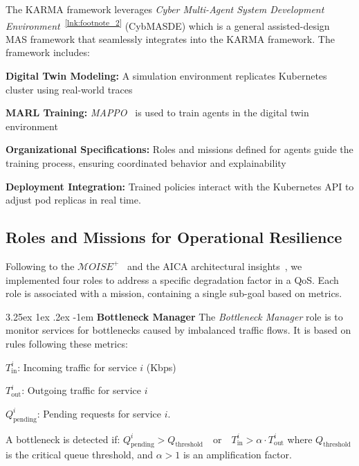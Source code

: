 \documentclass[conference]{IEEEtran}
\makeatletter
\renewcommand\paragraph{\@startsection{paragraph}{5}{\z@}%
  {3.25ex \@plus1ex \@minus.2ex}%
  {-1em}%
  {\normalfont\normalsize\bfseries}}
\makeatother
\begin{document}
The KARMA framework leverages \textit{Cyber Multi-Agent System Development Environment}~\textsuperscript{\ref{lnk:footnote_2}} (CybMASDE) which is a general assisted-design MAS framework that seamlessly integrates into the KARMA framework.
The framework includes:
\begin{enumerate*}[label=\textbf{\arabic*)}, itemjoin={;\quad }]
    \item \textbf{Digital Twin Modeling:} A simulation environment replicates Kubernetes cluster using real-world traces
    \item \textbf{MARL Training:} \textit{MAPPO}~\cite{Yu2022} is used to train agents in the digital twin environment
    \item \textbf{Organizational Specifications:} Roles and missions defined for agents guide the training process, ensuring coordinated behavior and explainability
    \item \textbf{Deployment Integration:} Trained policies interact with the Kubernetes API to adjust pod replicas in real time.
\end{enumerate*}

\subsection{Roles and Missions for Operational Resilience}

\noindent Following to the $\mathcal{M}OISE^+$~\cite{hubner2002moise} and the AICA architectural insights~\cite{kott2018autonomous}, we implemented four roles to address a specific degradation factor in a QoS.
Each role is associated with a mission, containing a single sub-goal based on metrics.

\noindent \paragraph{\textbf{Bottleneck Manager}}
%
The \textit{Bottleneck Manager} role is to monitor services for bottlenecks caused by imbalanced traffic flows. It is based on rules following these metrics:
\begin{enumerate*}[label={}, itemjoin={;\quad }]
    \item \( T_{\text{in}}^i \): Incoming traffic for service \( i \) (Kbps)
    \item \( T_{\text{out}}^i \): Outgoing traffic for service \( i \)
    \item \( Q_{\text{pending}}^i \): Pending requests for service \( i \).
\end{enumerate*}
A bottleneck is detected if: $Q_{\text{pending}}^i > Q_{\text{threshold}} \quad \text{or} \quad T_{\text{in}}^i > \alpha \cdot T_{\text{out}}^i$
where \( Q_{\text{threshold}} \) is the critical queue threshold, and \( \alpha > 1 \) is an amplification factor.
\end{document}
